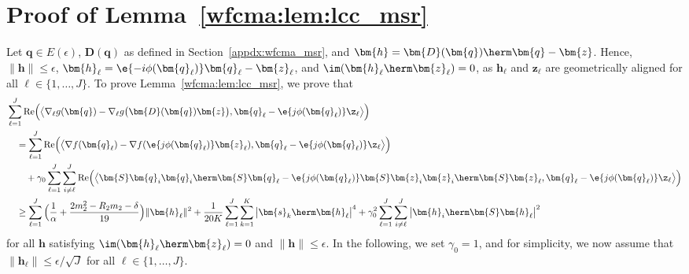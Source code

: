 			\section{Proof of Lemma~\ref{wfcma:lem:lcc_msr}}\label{wfcma:appdx:lcc_msr}
			Let $\bm{q}\in E(\epsilon)$, $\bm{D}(\bm{q})$ as defined in Section~\ref{appdx:wfcma_msr}, and $\bm{h}=\bm{D}(\bm{q})\herm\bm{q}-\bm{z}$. Hence, $\|\bm{h}\|\leq\epsilon$, $\bm{h}_{\ell}=\e{-i\phi(\bm{q}_{\ell})}\bm{q}_{\ell}-\bm{z}_{\ell}$, and
			$\im(\bm{h}_{\ell}\herm\bm{z}_{\ell})=0$, as $\bm{h}_{\ell}$ and $\bm{z}_{\ell}$ are geometrically aligned for all ${\ell}\in\{1,\ldots,J\}$.
			To prove Lemma~\ref{wfcma:lem:lcc_msr}, we prove that 
			\begin{align}
				&\sum_{{\ell}=1}^J\mathrm{Re}\Big( \big\langle\nabla_{\ell} g(\bm{q})-
				\nabla_{\ell} g\big(\bm{D}(\bm{q})\bm{z}\big), \bm{q}_{\ell} - \e{j\phi(\bm{q}_{\ell})}\z_{\ell}\big\rangle\Big)\nonumber\\
				&\quad=\sum_{{\ell}=1}^J\mathrm{Re}\Big( \big\langle\nabla f(\bm{q}_{\ell})-\nabla f(\e{j\phi(\bm{q}_{\ell})}\bm{z}_{\ell}), \bm{q}_{\ell} - \e{j\phi(\bm{q}_{\ell})}\z_{\ell}\big\rangle\Big)
				\nonumber\\&\qquad
				+\gamma_0\sum_{{\ell}=1}^J\sum_{i\neq {\ell}}^J\mathrm{Re}\Big( \big\langle\bm{S}\bm{q}_{i}\bm{q}_{i}\herm\bm{S}\bm{q}_{\ell} -\e{j\phi(\bm{q}_{\ell})} \bm{S}\bm{z}_{i}\bm{z}_{i}\herm\bm{S}\bm{z}_{\ell}, \bm{q}_{\ell} - \e{j\phi(\bm{q}_{\ell})}\z_{\ell}\big\rangle\Big)\nonumber\\
				&\quad\geq  \sum_{{\ell}=1}^J\Big(\frac{1}{\alpha}+\frac{2  m_2^2-R_2  m_2-\delta}{19}\Big)\|\bm{h}_{\ell}\|^2+ \frac{1}{20 K}\sum_{{\ell}=1}^J\sum_{k=1}^K \big|\bm{s}_k\herm\bm{h}_{\ell}\big|^4+\gamma_0^2\sum_{{\ell}=1}^J\sum_{i\neq {\ell}}^J\big|\bm{h}_i\herm\bm{S}\bm{h}_{\ell}\big|^2\label{eqn:llc_msr}
			\end{align}
			for all $\bm{h}$ satisfying $\im(\bm{h}_{\ell}\herm\bm{z}_{\ell})=0$ and $\|\bm{h}\|\leq\epsilon$. In the following, we set $\gamma_0=1$, and for simplicity, we now assume that $\|\bm{h}_{\ell}\|\leq\epsilon/\sqrt{J}$ for all ${\ell}\in\{1,\ldots,J\}$. 
